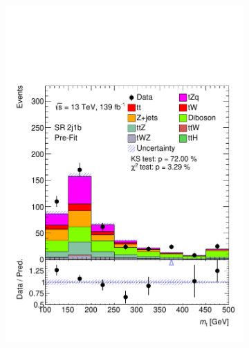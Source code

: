 \begin{figure}[h!]
\begin{subfigure}[b]{0.33\linewidth}
    \includegraphics[width=\linewidth]{ubonn-thesis/Chapters/Chapters_05/Figure/SR/SR_2j1b_Top_mass.pdf} 
  \end{subfigure}%
  \newline
  \begin{subfigure}[b]{0.33\linewidth}
    \centering

\end{subfigure}
\end{figure}
